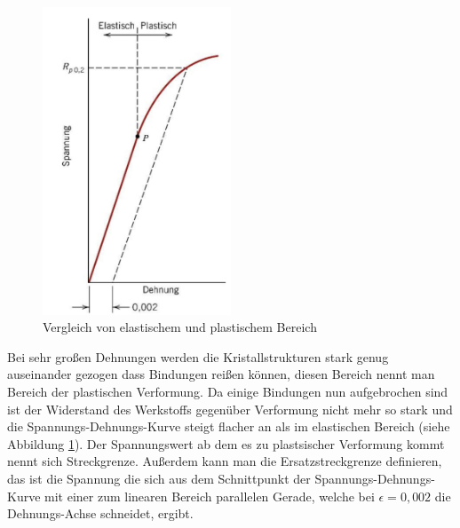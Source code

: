 \documentclass[11pt,a4paper]{article}
\numberwithin{equation}{section}
\numberwithin{figure}{section}
\begin{document}
\\
\begin{addmargin}[25pt]{0pt}
\begin{figure}[h]
    \centering
    \includegraphics[width=0.5\textwidth]{images/Materialwissenschaften/plastische_Verformung.jpeg}
    \caption{Vergleich von elastischem und plastischem Bereich }
    \label{fig:plastische_Verformung}
\end{figure}
Bei sehr großen Dehnungen werden die Kristallstrukturen stark genug auseinander gezogen dass Bindungen reißen können, diesen Bereich nennt man Bereich der plastischen Verformung. Da einige Bindungen nun aufgebrochen sind ist der Widerstand des Werkstoffs gegenüber Verformung nicht mehr so stark und die Spannungs-Dehnungs-Kurve steigt flacher an als im elastischen Bereich (siehe Abbildung \ref{fig:plastische_Verformung}). Der Spannungswert ab dem es zu plastsischer Verformung kommt nennt sich Streckgrenze. Außerdem kann man die Ersatzstreckgrenze definieren, das ist die Spannung die sich aus dem Schnittpunkt der Spannungs-Dehnungs-Kurve mit einer zum linearen Bereich parallelen Gerade, welche bei $\epsilon = 0,002$ die Dehnungs-Achse schneidet, ergibt.\\
\end{addmargin}
\end{document}
